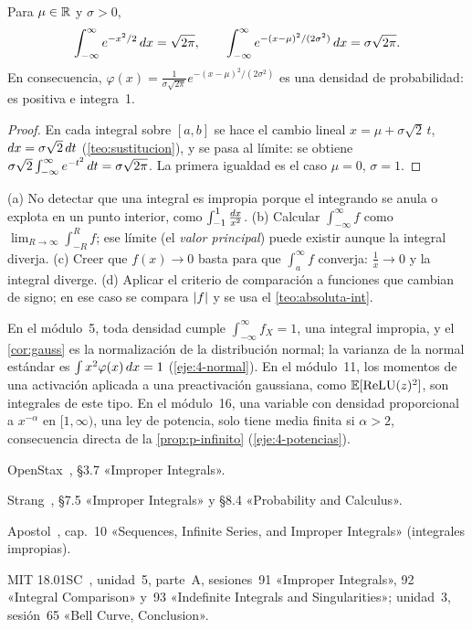 \begin{corolario}\label{cor:gauss}
Para $\mu\in\mathbb{R}$ y $\sigma>0$,
\[
\int_{-\infty}^{\infty}e^{-x^{2}/2}\mathop{}\!d x=\sqrt{2\pi},\qquad\int_{-\infty}^{\infty}e^{-(x-\mu)^{2}/(2\sigma^{2})}\mathop{}\!d x=\sigma\sqrt{2\pi}.
\]
En consecuencia, $\varphi(x)=\frac{1}{\sigma\sqrt{2\pi}}e^{-(x-\mu)^{2}/(2\sigma^{2})}$ es una densidad de probabilidad: es positiva e integra~1.
\end{corolario}

\begin{proof}
En cada integral sobre $[a,b]$ se hace el cambio lineal $x=\mu+\sigma\sqrt2\,t$, $\mathop{}\!d x=\sigma\sqrt2\mathop{}\!d t$ (\cref{teo:sustitucion}), y se pasa al límite: se obtiene $\sigma\sqrt2\int_{-\infty}^{\infty}e^{-t^{2}}\mathop{}\!d t=\sigma\sqrt{2\pi}$. La primera igualdad es el caso $\mu=0$, $\sigma=1$.
\end{proof}

\begin{observacion}\label{obs:4-errores}
(a) No detectar que una integral es impropia porque el integrando se anula o explota en un punto interior, como $\int_{-1}^{1}\frac{\mathop{}\!d x}{x^{2}}$. (b) Calcular $\int_{-\infty}^{\infty}f$ como $\lim_{R\to\infty}\int_{-R}^{R}f$; ese límite (el \emph{valor principal}) puede existir aunque la integral diverja. (c) Creer que $f(x)\to0$ basta para que $\int_a^{\infty}f$ converja: $\frac1x\to0$ y la integral diverge. (d) Aplicar el criterio de comparación a funciones que cambian de signo; en ese caso se compara $\lvert f\rvert$ y se usa el \cref{teo:absoluta-int}.
\end{observacion}

\begin{observacion}
En el módulo~5, toda densidad cumple $\int_{-\infty}^{\infty}f_X=1$, una integral impropia, y el \cref{cor:gauss} es la normalización de la distribución normal; la varianza de la normal estándar es $\int x^{2}\varphi(x)\mathop{}\!d x=1$ (\cref{eje:4-normal}). En el módulo~11, los momentos de una activación aplicada a una preactivación gaussiana, como $\mathbb{E}[\mathrm{ReLU}(z)^{2}]$, son integrales de este tipo. En el módulo~16, una variable con densidad proporcional a $x^{-\alpha}$ en $[1,\infty)$, una ley de potencia, solo tiene media finita si $\alpha>2$, consecuencia directa de la \cref{prop:p-infinito} (\cref{eje:4-potencias}).
\end{observacion}

\begin{lecturas}
\item OpenStax~\cite{openstax2}, §3.7 «Improper Integrals».
\item Strang~\cite{strang}, §7.5 «Improper Integrals» y §8.4 «Probability and Calculus».
\item Apostol~\cite{apostol}, cap.~10 «Sequences, Infinite Series, and Improper Integrals» (integrales impropias).
\item MIT 18.01SC~\cite{mit1801}, unidad~5, parte~A, sesiones~91 «Improper Integrals», 92 «Integral Comparison» y~93 «Indefinite Integrals and Singularities»; unidad~3, sesión~65 «Bell Curve, Conclusion».
\end{lecturas}

